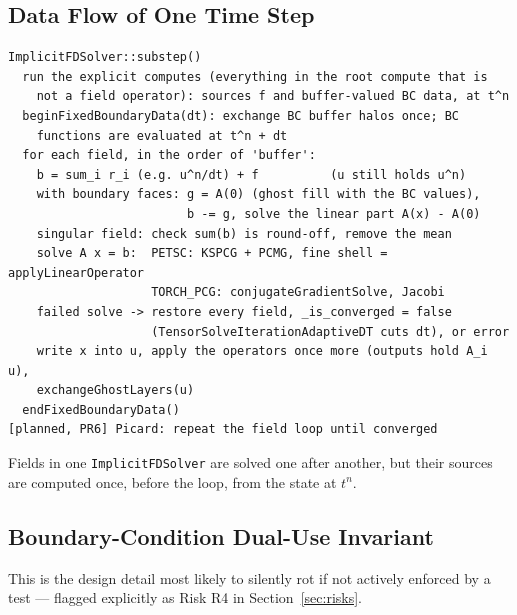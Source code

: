 \documentclass[11pt]{article}
\newenvironment{schematic}{%
  \begin{tcolorbox}[breakable, colback=codebg, colframe=gray!40, boxrule=0.4pt, arc=1mm, left=4mm, right=4mm, top=2mm, bottom=2mm]
  \ttfamily\footnotesize
}{%
  \end{tcolorbox}
}
\begin{document}
\subsection{Data Flow of One Time Step}

\begin{schematic}
\begin{verbatim}
ImplicitFDSolver::substep()
  run the explicit computes (everything in the root compute that is
    not a field operator): sources f and buffer-valued BC data, at t^n
  beginFixedBoundaryData(dt): exchange BC buffer halos once; BC
    functions are evaluated at t^n + dt
  for each field, in the order of 'buffer':
    b = sum_i r_i (e.g. u^n/dt) + f          (u still holds u^n)
    with boundary faces: g = A(0) (ghost fill with the BC values),
                         b -= g, solve the linear part A(x) - A(0)
    singular field: check sum(b) is round-off, remove the mean
    solve A x = b:  PETSC: KSPCG + PCMG, fine shell = applyLinearOperator
                    TORCH_PCG: conjugateGradientSolve, Jacobi
    failed solve -> restore every field, _is_converged = false
                    (TensorSolveIterationAdaptiveDT cuts dt), or error
    write x into u, apply the operators once more (outputs hold A_i u),
    exchangeGhostLayers(u)
  endFixedBoundaryData()
[planned, PR6] Picard: repeat the field loop until converged
\end{verbatim}
\end{schematic}

Fields in one \texttt{ImplicitFDSolver} are solved one after another, but
their sources are computed once, before the loop, from the state at $t^n$.

\subsection{Boundary-Condition Dual-Use Invariant}

This is the design detail most likely to silently rot if not actively
enforced by a test --- flagged explicitly as Risk R4 in
Section~\ref{sec:risks}.
\end{document}
